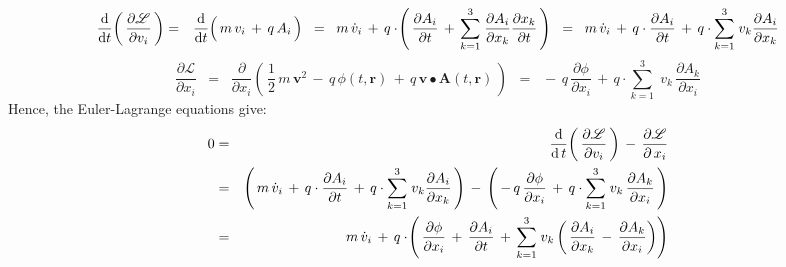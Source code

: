 \begin{eqnarray*}
\dfrac{\d}{\d t}\!\left(\,\dfrac{\partial\mathscr{L}}{\partial v_{i}}\,\right)
& = &
    \dfrac{\d}{\d t}\!\left(\,
        m\,v_{i}
        \, \overset{{\color{white}.}}{+} \,
        q\,A_{i}
        \,\right)
\;\; = \;\;
    m\,\dot{v}_{i}
    \, + \,
    q\cdot\!\left(\,
        \dfrac{\partial A_{i}}{\partial t}
        \, + \,
        \overset{3}{\underset{k=1}{\sum}}\;
        \dfrac{\partial A_{i}}{\partial x_{k}}
        \dfrac{\partial x_{k}}{\partial t}
        \,\right)
\;\; = \;\;
    m\,\dot{v}_{i}
    \, + \,
    q\cdot\dfrac{\partial A_{i}}{\partial t}
    \, + \,
    q\cdot
    \overset{3}{\underset{k=1}{\sum}}\;
    v_{k}
    \dfrac{\partial A_{i}}{\partial x_{k}}
\end{eqnarray*}
\begin{equation*}
\dfrac{\partial\mathscr{L}}{\partial x_{i}}
\;\; = \;\;
    \dfrac{\partial}{\partial x_{i}}\!
    \left(\,
        \dfrac{1}{2}\,m\,\mathbf{v}^2
        \, - \,
        q\,\phi(t,\mathbf{r})
        \, + \,
        q\,\mathbf{v} \bullet \mathbf{A}(t,\mathbf{r})
        \,\right)
\;\; = \;\;
    -\,q\,\dfrac{\partial\phi}{\partial x_{i}}
    \, + \,
    q\cdot\overset{3}{\underset{k=1}{\sum}}\;v_{k}\,\dfrac{\partial A_{k}}{\partial x_{i}}
\end{equation*}
Hence, the Euler-Lagrange equations give:
\begin{eqnarray*}
0
& = &
    \dfrac{\textnormal{d}}{\textnormal{d}\,t}\!\left(\,\dfrac{\partial\mathscr{L}}{\partial v_{i}}\,\right)
    \, - \,
    \dfrac{\partial\mathscr{L}}{\partial\,x_{i}}
\\
& = &
    \left(\,
        m\,\dot{v}_{i}
        \, + \,
        q\cdot\dfrac{\partial A_{i}}{\partial t}
        \, + \,
        q\cdot
        \overset{3}{\underset{k=1}{\sum}}\;
        v_{k}
        \dfrac{\partial A_{i}}{\partial x_{k}}
        \,\right)
    \, - \,
    \left(\,
        -\,q\,\dfrac{\partial\phi}{\partial x_{i}}
        \, + \,
        q\cdot\overset{3}{\underset{k=1}{\sum}}\;v_{k}\,\dfrac{\partial A_{k}}{\partial x_{i}}
        \,\right)
\\
& = &
    m\,\dot{v}_{i}
    \, + \,
    q \cdot\!\left(\,
        \dfrac{\partial\phi}{\partial x_{i}}
        \, + \,
        \dfrac{\partial A_{i}}{\partial t}
        \, + \,
        \overset{3}{\underset{k=1}{\sum}}\;v_{k}\left(\,
            \dfrac{\partial A_{i}}{\partial x_{k}}
            \, - \,
            \dfrac{\partial A_{k}}{\partial x_{i}}
            \right)
        \right)
\end{eqnarray*}
